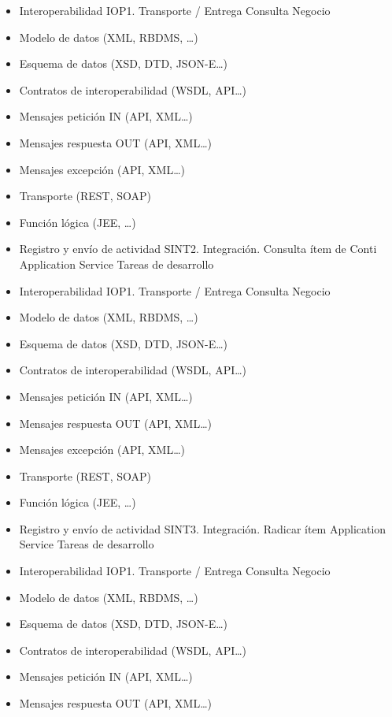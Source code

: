 \documentclass[
  paper=a4,
  ,captions=tableheading
]{scrartcl}
\begin{document}
\begin{itemize}
\item
  Interoperabilidad IOP1. Transporte / Entrega Consulta Negocio
\item
  Modelo de datos (XML, RBDMS, \ldots)
\item
  Esquema de datos (XSD, DTD, JSON-E\ldots)
\item
  Contratos de interoperabilidad (WSDL, API\ldots)
\item
  Mensajes petición IN (API, XML\ldots)
\item
  Mensajes respuesta OUT (API, XML\ldots)
\item
  Mensajes excepción (API, XML\ldots)
\item
  Transporte (REST, SOAP)
\item
  Función lógica (JEE, \ldots)
\item
  Registro y envío de actividad \textbar{} \textbar{} SINT2.
  Integración. Consulta ítem de Conti \textbar{} Application Service
  \textbar{} Tareas de desarrollo
\item
  Interoperabilidad IOP1. Transporte / Entrega Consulta Negocio
\item
  Modelo de datos (XML, RBDMS, \ldots)
\item
  Esquema de datos (XSD, DTD, JSON-E\ldots)
\item
  Contratos de interoperabilidad (WSDL, API\ldots)
\item
  Mensajes petición IN (API, XML\ldots)
\item
  Mensajes respuesta OUT (API, XML\ldots)
\item
  Mensajes excepción (API, XML\ldots)
\item
  Transporte (REST, SOAP)
\item
  Función lógica (JEE, \ldots)
\item
  Registro y envío de actividad \textbar{} \textbar{} SINT3.
  Integración. Radicar ítem \textbar{} Application Service \textbar{}
  Tareas de desarrollo
\item
  Interoperabilidad IOP1. Transporte / Entrega Consulta Negocio
\item
  Modelo de datos (XML, RBDMS, \ldots)
\item
  Esquema de datos (XSD, DTD, JSON-E\ldots)
\item
  Contratos de interoperabilidad (WSDL, API\ldots)
\item
  Mensajes petición IN (API, XML\ldots)
\item
  Mensajes respuesta OUT (API, XML\ldots)

\end{itemize}
\end{document}
